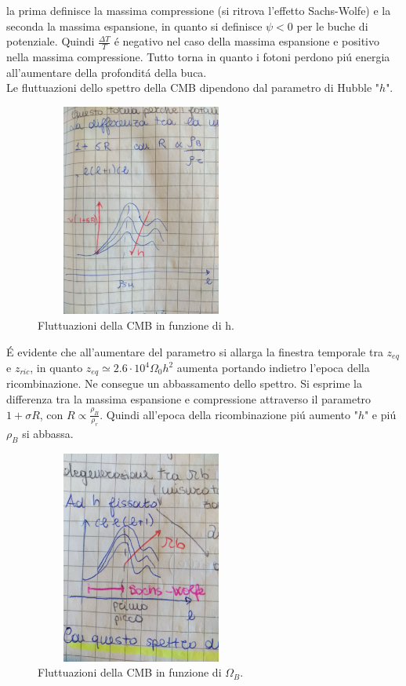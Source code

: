 \documentclass[12pt, a4paper]{article}
\begin{document}
la prima definisce la massima compressione (si ritrova l'effetto Sachs-Wolfe) e la seconda la massima espansione, in quanto si definisce $\psi<0$ per le buche di potenziale. Quindi $\frac{\Delta T}{T}$ \'{e} negativo nel caso della massima espansione e positivo nella massima compressione. Tutto torna in quanto i fotoni perdono pi\'{u} energia all'aumentare della profondit\'{a} della buca.\\
Le fluttuazioni dello spettro della CMB dipendono dal parametro di Hubble "$h$".
\begin{figure}[htp]
\centering
\includegraphics[width=7cm, height=7cm]{images/flucH.jpeg}
\caption{Fluttuazioni della CMB in funzione di h.}
\label{fig:flucH}
\end{figure}
\'{E} evidente che all'aumentare del parametro si allarga la finestra temporale tra $z_{eq}$ e $z_{ric}$, in quanto $z_{eq}\simeq 2.6 \cdot 10^{4} \Omega_0 h^2$ aumenta portando indietro l'epoca della ricombinazione. Ne consegue un abbassamento dello spettro. Si esprime la differenza tra la massima espansione e compressione attraverso il parametro $1+\sigma R$, con $R\propto \frac{\rho_B}{\rho_r}$. Quindi all'epoca della ricombinazione pi\'{u} aumento "$h$" e pi\'{u} $\rho_B$ si abbassa.
\begin{figure}[htp]
\centering
\includegraphics[width=7cm, height=7cm]{images/flucB.jpeg}
\caption{Fluttuazioni della CMB in funzione di $\Omega_B$.}
\label{fig:flucB}
\end{figure}
\end{document}
